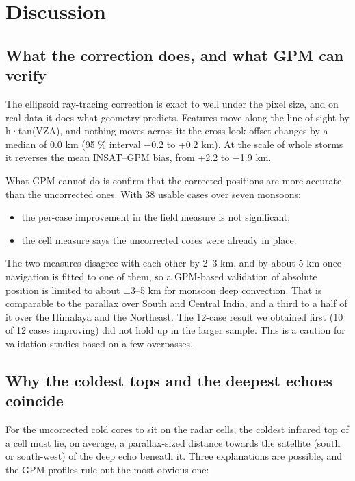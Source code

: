 \section{Discussion}
\label{sec:discussion}
\label{sec:6}

\subsection{What the correction does, and what GPM can verify}\label{sec:6.1}

The ellipsoid ray-tracing correction is exact to well under the pixel size, and on real data it does what geometry predicts. Features move along the line of sight by h·tan(VZA), and nothing moves across it: the cross-look offset changes by a median of 0.0 km (95 \% interval −0.2 to +0.2 km). At the scale of whole storms it reverses the mean INSAT--GPM bias, from +2.2 to −1.9 km.

What GPM cannot do is confirm that the corrected positions are more accurate than the uncorrected ones. With 38 usable cases over seven monsoons:

\begin{itemize}
\tightlist
\item
  the per-case improvement in the field measure is not significant;
\item
  the cell measure says the uncorrected cores were already in place.
\end{itemize}

The two measures disagree with each other by 2--3 km, and by about 5 km once navigation is fitted to one of them, so a GPM-based validation of absolute position is limited to about ±3--5 km for monsoon deep convection. That is comparable to the parallax over South and Central India, and a third to a half of it over the Himalaya and the Northeast. The 12-case result we obtained first (10 of 12 cases improving) did not hold up in the larger sample. This is a caution for validation studies based on a few overpasses.

\subsection{Why the coldest tops and the deepest echoes coincide}\label{sec:6.2}

For the uncorrected cold cores to sit on the radar cells, the coldest infrared top of a cell must lie, on average, a parallax-sized distance towards the satellite (south or south-west) of the deep echo beneath it. Three explanations are possible, and the GPM profiles rule out the most obvious one:

